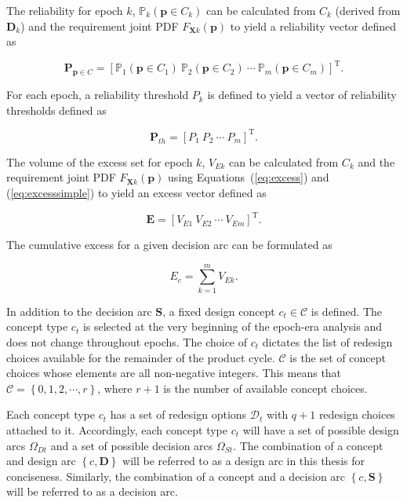 The reliability for epoch $k$, $\mathbb{P}_k(\mathbf{p} \in C_k)$ can be calculated from $C_k$ (derived from $\mathbf{D}_k$) and the requirement joint \ac{PDF} $F_{\mathbf{X}k}(\mathbf{p})$ to yield a reliability vector defined as

\begin{equation} \label{eq:reliabilityvector}
	\mathbf{P}_{\mathbf{p} \in {C}} = \left[\mathbb{P}_1(\mathbf{p} \in C_1) ~ \mathbb{P}_2(\mathbf{p} \in C_2) ~ \cdots ~ \mathbb{P}_m(\mathbf{p} \in C_m)\right]^{\mathrm{T}}.
\end{equation}

For each epoch, a reliability threshold $P_k$ is defined to yield a vector of reliability thresholds defined as

\begin{equation} \label{eq:reliabilitythvector}
	\mathbf{P}_{th} = \left[P_1 ~ P_2 ~ \cdots ~ P_m\right]^{\mathrm{T}}.
\end{equation}

The volume of the excess set for epoch $k$, $V_{Ek}$ can be calculated from $C_k$ and the requirement joint \ac{PDF} $F_{\mathbf{X}k}(\mathbf{p})$ using Equations~(\ref{eq:excess}) and (\ref{eq:excesssimple}) to yield an excess vector defined as

\begin{equation} \label{eq:excessvector}
	\mathbf{E} = \left[V_{E1} ~ V_{E2} ~ \cdots ~ V_{Em}\right]^{\mathrm{T}}.
\end{equation}

The cumulative excess for a given decision arc can be formulated as

\begin{equation} \label{eq:excesscumulative}
	E_c = \sum\limits_{k=1}^{m} V_{Ek}.
\end{equation}

In addition to the decision arc $\mathbf{S}$, a fixed design concept $c_t\in\mathcal{C}$ is defined. The concept type $c_t$ is selected at the very beginning of the epoch-era analysis and does not change throughout epochs. The choice of $c_t$ dictates the list of redesign choices available for the remainder of the product cycle. $\mathcal{C}$ is the set of concept choices whose elements are all non-negative integers. This means that $\mathcal{C} = \left\{0,1,2,\cdots,r\right\}$, where $r + 1$ is the number of available concept choices.

Each concept type $c_t$ has a set of redesign options $\mathcal{D}_t$ with $q+1$ redesign choices attached to it. Accordingly, each concept type $c_t$ will have a set of possible design arcs $\Omega_{Dt}$ and a set of possible decision arcs $\Omega_{St}$. The combination of a concept and design arc $\left\{c,\mathbf{D}\right\}$ will be referred to as a design arc in this thesis for conciseness. Similarly, the combination of a concept and a decision arc $\left\{c,\mathbf{S}\right\}$ will be referred to as a decision arc.

